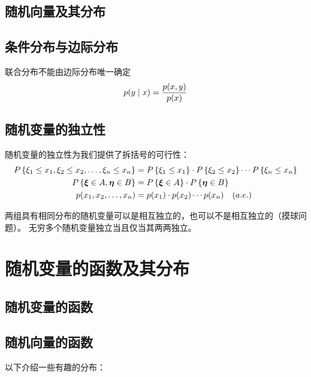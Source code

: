 \subsection{随机向量及其分布}
\subsection{条件分布与边际分布}
联合分布不能由边际分布唯一确定
\[
    p(y\mid x)=\frac{p(x,y)}{p(x)} \\
\]

\subsection{随机变量的独立性}
随机变量的独立性为我们提供了拆括号的可行性：
\begin{align*}
    P\left\{\xi_{1} \leq x_{1}, \xi_{2} \leq x_{2}, \dots ,
    \xi_{n} \leq x_{n}\right\} &=
    P\left\{\xi_{1} \leq x_{1}\right\} \cdot
    P\left\{\xi_{2} \leq x_{2}\right\} \cdots
    P\left\{\xi_{n} \leq x_{n}\right\}\\
    P\left\{\bm{\xi} \in A, \bm{\eta} \in B\right\} &=
    P\left\{\bm{\xi} \in A\right\} \cdot
    P\left\{\bm{\eta} \in B\right\} \\
    p(x_{1},x_{2},\ldots,x_{n}) &= p(x_{1}) \cdot p(x_{2})
    \cdots p(x_{n}) \quad (a. e.)
\end{align*}

两组具有相同分布的随机变量可以是相互独立的，也可以不是相互独立的（摸球问题）。
无穷多个随机变量独立当且仅当其两两独立。

\section{随机变量的函数及其分布}
\subsection{随机变量的函数}
\subsection{随机向量的函数}

以下介绍一些有趣的分布：

